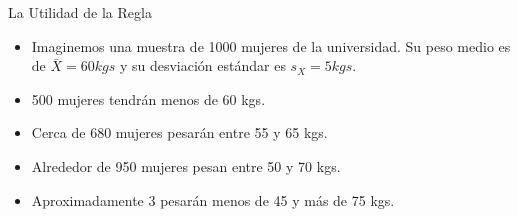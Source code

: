 \documentclass[xcolor=dvipsnames]{beamer}
\begin{document}
\begin{frame}{La Utilidad de la Regla}
\begin{itemize}
\item Imaginemos una muestra de 1000 mujeres de la universidad. Su peso medio es de $\bar{X}=60 kgs$ y su desviación estándar es $s_X=5 kgs$.
\item 500 mujeres tendrán menos de 60 kgs.
\item Cerca de 680 mujeres pesarán entre 55 y 65 kgs.
\item Alrededor de 950 mujeres pesan entre 50 y 70 kgs.
\item Aproximadamente 3 pesarán menos de 45 y más de 75 kgs.
\end{itemize}

\end{frame}
\end{document}
